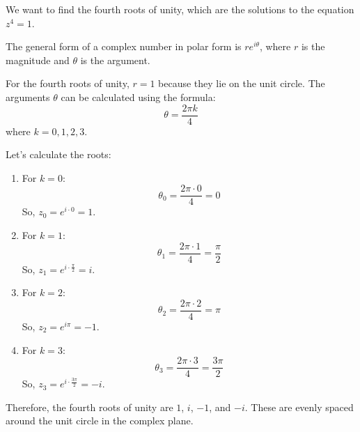 \documentclass[12pt, a4paper]{article}
\begin{document}
\begin{example}
    We want to find the fourth roots of unity, which are the solutions to the equation \(z^4 = 1\).

The general form of a complex number in polar form is \(re^{i\theta}\), where \(r\) is the magnitude and \(\theta\) is the argument.

For the fourth roots of unity, \(r = 1\) because they lie on the unit circle. The arguments \(\theta\) can be calculated using the formula:
\[\theta = \frac{2\pi k}{4}\]
where \(k = 0, 1, 2, 3\).

Let's calculate the roots:

\begin{enumerate}
    \item For \(k = 0\):
    \[\theta_0 = \frac{2\pi \cdot 0}{4} = 0\]
    So, \(z_0 = e^{i\cdot0} = 1\).
    
    \item For \(k = 1\):
    \[\theta_1 = \frac{2\pi \cdot 1}{4} = \frac{\pi}{2}\]
    So, \(z_1 = e^{i\cdot\frac{\pi}{2}} = i\).
    
    \item For \(k = 2\):
    \[\theta_2 = \frac{2\pi \cdot 2}{4} = \pi\]
    So, \(z_2 = e^{i\pi} = -1\).
    
    \item For \(k = 3\):
    \[\theta_3 = \frac{2\pi \cdot 3}{4} = \frac{3\pi}{2}\]
    So, \(z_3 = e^{i\cdot\frac{3\pi}{2}} = -i\).
\end{enumerate}

Therefore, the fourth roots of unity are \(1\), \(i\), \(-1\), and \(-i\). These are evenly spaced around the unit circle in the complex plane.


\end{example}
\end{document}
